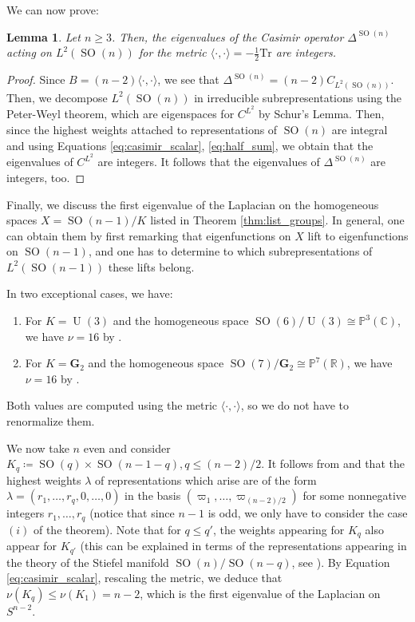 \documentclass[12pt]{amsart}
\numberwithin{numbering}{section}
\theoremstyle{plain}
\newtheorem{lem}[numbering]{Lemma}
\theoremstyle{definition}
\theoremstyle{remark}
\numberwithin{equation}{section}
\DeclareMathOperator{\SO}{SO}
\DeclareMathOperator{\U}{U}
\newcommand{\R}{\mathbb{R}}
\newcommand{\C}{\mathbb{C}}
\begin{document}
We can now prove:
\begin{lem} \label{lem:optim_poincare}
Let $n \geq 3$. Then, the eigenvalues of the Casimir operator $\Delta^{\SO(n)}$ acting on $L^2(\SO(n))$ for the metric $\langle \cdot, \cdot \rangle = - \frac{1}{2} \mathrm{Tr}$ are integers.
\end{lem}

\begin{proof}
Since $B = (n-2) \langle \cdot, \cdot \rangle$, we see that $\Delta^{\SO(n)} = (n-2) C_{L^2(\SO(n))}$. Then, we decompose $L^2(\SO(n))$ in irreducible subrepresentations using the Peter-Weyl theorem, which are eigenspaces for $C^{L^2}$ by Schur's Lemma. Then, since the highest weights attached to representations of $\SO(n)$ are integral and using Equations \ref{eq:casimir_scalar}, \eqref{eq:half_sum}, we obtain that the eigenvalues of $C^{L^2}$ are integers. It follows that the eigenvalues of $\Delta^{\SO(n)}$ are integers, too.
\end{proof}

Finally, we discuss the first eigenvalue of the Laplacian on the homogeneous spaces $X = \SO(n-1)/K$ listed in Theorem \ref{thm:list_groups}. In general, one can obtain them by first remarking that eigenfunctions on $X$ lift to eigenfunctions on $\SO(n-1)$, and one has to determine to which subrepresentations of $L^2(\SO(n-1))$ these lifts belong.

In two exceptional cases, we have:
\begin{enumerate}
\item For $K = \U(3)$ and the homogeneous space $\SO(6) / \U(3) \cong \mathbb{P}^3(\C)$, we have $\nu = 16$ by \cite[Proposition C.III.1]{berger2006spectre}.
\item For $K = \mathbf{G}_2$ and the homogeneous space $\SO(7) / \mathbf{G}_2 \cong \mathbb{P}^7(\R)$, we have $\nu = 16$ by \cite[Proposition C.II.1]{berger2006spectre}.
\end{enumerate}
Both values are computed using the metric $\langle \cdot, \cdot \rangle$, so we do not have to renormalize them.

\smallskip

We now take $n$ even and consider $K_q \coloneq \SO(q) \times \SO(n-1-q), q \leq (n-2)/2$. It follows from \cite[Theorem 5]{strichartz1975explicit} and \cite[Proposition 5.28]{knapp1996lie} that the highest weights $\lambda$ of representations which arise are of the form $\lambda = (r_1, \ldots, r_q, 0, \ldots, 0)$ in the basis $(\varpi_1, \ldots, \varpi_{(n-2)/2})$ for some nonnegative integers $r_1, \ldots, r_q$ (notice that since $n-1$ is odd, we only have to consider the case $(i)$ of the theorem). Note that for $q \leq q'$, the weights appearing for $K_q$ also appear for $K_{q'}$ (this can be explained in terms of the representations appearing in the theory of the Stiefel manifold $\SO(n) / \SO(n-q)$, see \cite{strichartz1975explicit}). By Equation \eqref{eq:casimir_scalar}, rescaling the metric, we deduce that $\nu(K_q) \leq \nu(K_1) = n-2$, which is the first eigenvalue of the Laplacian on $S^{n-2}$.
\end{document}
